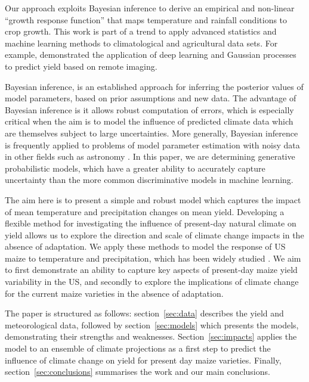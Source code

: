 \documentclass[12pt]{article}
\begin{document}
Our approach exploits Bayesian inference to derive an empirical and non-linear ``growth response function'' that maps temperature and rainfall conditions to crop growth. This work is part of a trend to apply advanced statistics and machine learning methods to climatological and agricultural data sets. For example, \citet{you:2017} demonstrated the application of deep learning and Gaussian processes to predict yield based on remote imaging. 

Bayesian inference, is an established approach for inferring the posterior values of model parameters, based on prior assumptions and new data. The advantage of Bayesian inference is it allows robust computation of errors, which is especially critical when the aim is to model the influence of predicted climate data which are themselves subject to large uncertainties. More generally, Bayesian inference is frequently applied to problems of model parameter estimation with noisy data in other fields such as astronomy \citep{Hurley:2016}. In this paper, we are determining generative probabilistic models, which have a greater ability to accurately capture uncertainty than the more common discriminative models in machine learning.  

The aim here is to present a simple and robust model which captures the impact of mean temperature and precipitation changes on mean yield. Developing a flexible method for investigating the influence of present-day natural climate on yield allows us to explore the direction and scale of climate change impacts in the absence of adaptation. We apply these methods to model the response of US maize to temperature and precipitation, which has been widely studied \citep[e.g.][]{schlenker:2009, hatfield:2011, roberts:2012, lobell:2013, sanchez:2014, hatfield:2015, Partridge:2019}. We aim to first demonstrate an ability to capture key aspects of present-day maize yield variability in the US, and secondly to explore the implications of climate change for the current maize varieties in the absence of adaptation. 

The paper is structured as follows: section~\ref{sec:data} describes the yield and meteorological data, followed by section~\ref{sec:models} which presents the models, demonstrating their strengths and weaknesses. Section~\ref{sec:impacts} applies the model to an ensemble of climate projections as a first step to predict the influence of climate change on yield for present day maize varieties. Finally, section~\ref{sec:conclusions} summarises the work and our main conclusions.
\end{document}
